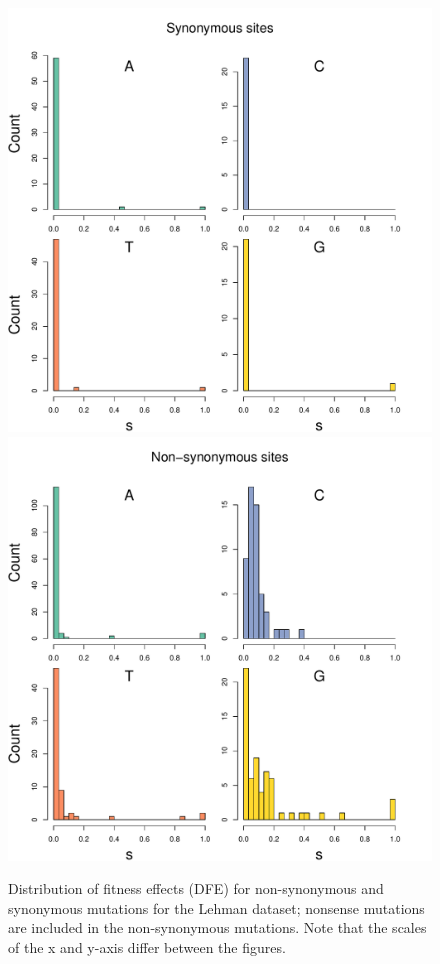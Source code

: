 \documentclass{article}
\begin{document}
\begin{figure}[ht!]
\centering
\includegraphics[scale = .45]{F3-Lehman-syn.pdf}
\includegraphics[scale = .45]{F3-Lehman-nonsyn.pdf}
\caption{Distribution of fitness effects (DFE) for non-synonymous and synonymous mutations for the Lehman dataset; nonsense mutations are included in the non-synonymous mutations. Note that the scales of the x and y-axis differ between the figures.}
\label{Lehmannonsyn}
\end{figure}
\end{document}
